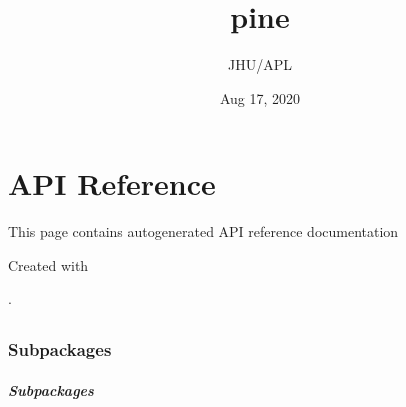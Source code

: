 \documentclass[letterpaper,10pt,english]{sphinxmanual}
\title{pine}
\date{Aug 17, 2020}
\author{JHU/APL}
\begin{document}
\pagestyle{empty}
\sphinxmaketitle
\pagestyle{plain}
\sphinxtableofcontents
\pagestyle{normal}
\label{\detokenize{index::doc}}



\chapter{API Reference}
\label{\detokenize{autoapi/index:api-reference}}\label{\detokenize{autoapi/index::doc}}
This page contains auto\sphinxhyphen{}generated API reference documentation %
\begin{footnote}[1]\sphinxAtStartFootnote
Created with 
%
\end{footnote}.


\section{}
\label{\detokenize{autoapi/pine/index:module-pine}}\label{\detokenize{autoapi/pine/index:pine}}\label{\detokenize{autoapi/pine/index::doc}}

\subsection{Subpackages}
\label{\detokenize{autoapi/pine/index:subpackages}}

\subsubsection{}
\label{\detokenize{autoapi/pine/backend/index:module-pine.backend}}\label{\detokenize{autoapi/pine/backend/index:pine-backend}}\label{\detokenize{autoapi/pine/backend/index::doc}}

\paragraph{Subpackages}
\label{\detokenize{autoapi/pine/backend/index:subpackages}}

\subparagraph{}
\label{\detokenize{autoapi/pine/backend/admin/index:module-pine.backend.admin}}\label{\detokenize{autoapi/pine/backend/admin/index:pine-backend-admin}}\label{\detokenize{autoapi/pine/backend/admin/index::doc}}
\end{document}
